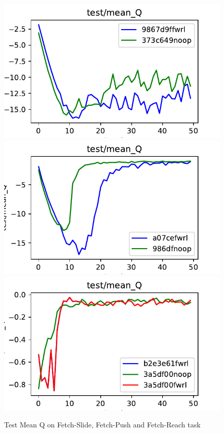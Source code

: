 \begin{figure}
  \def\frac{0.32}
    \includegraphics[width=\frac\columnwidth]{media/res/373c649_FetchSlide-v1-noop/test/mean_Q.pdf}%
    \includegraphics[width=\frac\columnwidth]{media/res/a077c9e_FetchPush-v1-fwrl/test/mean_Q.pdf}%
    \includegraphics[width=\frac\columnwidth]{media/res/3a5df00_FetchReach-v1-fwrl/test/mean_Q.pdf}
    \caption{Test Mean Q on Fetch-Slide, Fetch-Push and Fetch-Reach task}
    \label{fig:fetch-slide-success}
\end{figure}

